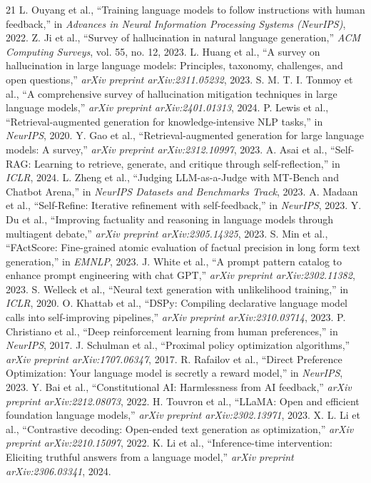 \documentclass[11pt,a4paper]{article}
\begin{document}
\begin{thebibliography}{21}
 L. Ouyang et al., ``Training language models to follow instructions with human feedback,'' in \textit{Advances in Neural Information Processing Systems (NeurIPS)}, 2022.
 Z. Ji et al., ``Survey of hallucination in natural language generation,'' \textit{ACM Computing Surveys}, vol. 55, no. 12, 2023.
 L. Huang et al., ``A survey on hallucination in large language models: Principles, taxonomy, challenges, and open questions,'' \textit{arXiv preprint arXiv:2311.05232}, 2023.
 S. M. T. I. Tonmoy et al., ``A comprehensive survey of hallucination mitigation techniques in large language models,'' \textit{arXiv preprint arXiv:2401.01313}, 2024.
 P. Lewis et al., ``Retrieval-augmented generation for knowledge-intensive NLP tasks,'' in \textit{NeurIPS}, 2020.
 Y. Gao et al., ``Retrieval-augmented generation for large language models: A survey,'' \textit{arXiv preprint arXiv:2312.10997}, 2023.
 A. Asai et al., ``Self-RAG: Learning to retrieve, generate, and critique through self-reflection,'' in \textit{ICLR}, 2024.
 L. Zheng et al., ``Judging LLM-as-a-Judge with MT-Bench and Chatbot Arena,'' in \textit{NeurIPS Datasets and Benchmarks Track}, 2023.
 A. Madaan et al., ``Self-Refine: Iterative refinement with self-feedback,'' in \textit{NeurIPS}, 2023.
 Y. Du et al., ``Improving factuality and reasoning in language models through multiagent debate,'' \textit{arXiv preprint arXiv:2305.14325}, 2023.
 S. Min et al., ``FActScore: Fine-grained atomic evaluation of factual precision in long form text generation,'' in \textit{EMNLP}, 2023.
 J. White et al., ``A prompt pattern catalog to enhance prompt engineering with chat GPT,'' \textit{arXiv preprint arXiv:2302.11382}, 2023.
 S. Welleck et al., ``Neural text generation with unlikelihood training,'' in \textit{ICLR}, 2020.
 O. Khattab et al., ``DSPy: Compiling declarative language model calls into self-improving pipelines,'' \textit{arXiv preprint arXiv:2310.03714}, 2023.
 P. Christiano et al., ``Deep reinforcement learning from human preferences,'' in \textit{NeurIPS}, 2017.
 J. Schulman et al., ``Proximal policy optimization algorithms,'' \textit{arXiv preprint arXiv:1707.06347}, 2017.
 R. Rafailov et al., ``Direct Preference Optimization: Your language model is secretly a reward model,'' in \textit{NeurIPS}, 2023.
 Y. Bai et al., ``Constitutional AI: Harmlessness from AI feedback,'' \textit{arXiv preprint arXiv:2212.08073}, 2022.
 H. Touvron et al., ``LLaMA: Open and efficient foundation language models,'' \textit{arXiv preprint arXiv:2302.13971}, 2023.
 X. L. Li et al., ``Contrastive decoding: Open-ended text generation as optimization,'' \textit{arXiv preprint arXiv:2210.15097}, 2022.
 K. Li et al., ``Inference-time intervention: Eliciting truthful answers from a language model,'' \textit{arXiv preprint arXiv:2306.03341}, 2024.
\end{thebibliography}
\end{document}
